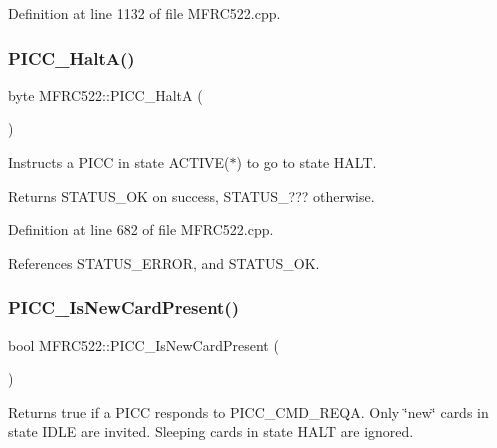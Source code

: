 Definition at line 1132 of file M\+F\+R\+C522.\+cpp.

\mbox{\label{class_m_f_r_c522_aaa152b63193d852bf2edcfae3044bea4}} 
\subsubsection{\texorpdfstring{P\+I\+C\+C\+\_\+\+Halt\+A()}{PICC\_HaltA()}}
{\footnotesize\ttfamily byte M\+F\+R\+C522\+::\+P\+I\+C\+C\+\_\+\+HaltA (\begin{DoxyParamCaption}{ }\end{DoxyParamCaption})}

Instructs a P\+I\+CC in state A\+C\+T\+I\+V\+E($\ast$) to go to state H\+A\+LT.

\begin{DoxyReturn}{Returns}
S\+T\+A\+T\+U\+S\+\_\+\+OK on success, S\+T\+A\+T\+U\+S\+\_\+??? otherwise. 
\end{DoxyReturn}


Definition at line 682 of file M\+F\+R\+C522.\+cpp.



References S\+T\+A\+T\+U\+S\+\_\+\+E\+R\+R\+OR, and S\+T\+A\+T\+U\+S\+\_\+\+OK.

\mbox{\label{class_m_f_r_c522_a3adca9d3b455c680ebcde3b74c4e567b}} 
\subsubsection{\texorpdfstring{P\+I\+C\+C\+\_\+\+Is\+New\+Card\+Present()}{PICC\_IsNewCardPresent()}}
{\footnotesize\ttfamily bool M\+F\+R\+C522\+::\+P\+I\+C\+C\+\_\+\+Is\+New\+Card\+Present (\begin{DoxyParamCaption}{ }\end{DoxyParamCaption})}

Returns true if a P\+I\+CC responds to P\+I\+C\+C\+\_\+\+C\+M\+D\+\_\+\+R\+E\+QA. Only \char`\"{}new\char`\"{} cards in state I\+D\+LE are invited. Sleeping cards in state H\+A\+LT are ignored.

